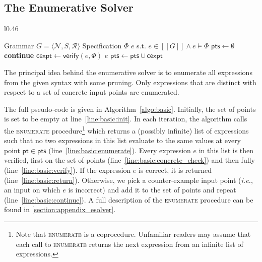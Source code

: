 \documentclass{llncs}
\newcommand{\ie}{\emph{i.e.}}
\newcommand\tuple[1]{\langle #1 \rangle}
\newcommand\Points{\mathsf{pts}}
\newcommand\Point{\mathsf{pt}}
\newcommand\Verify{\mathsf{verify}}
\newcommand\CexInput{\mathsf{cexpt}}
\newcommand\Expr{e}
\newcommand\Spec{\Phi}
\newcommand\Grammar{G}
\newcommand\sem[1]{[\![ #1 ]\!]}
\newcommand\NonTerminals{\mathcal{N}}
\newcommand\StartSymbol{S}
\newcommand\Rules{\mathcal{R}}
\begin{document}
\subsection{The Enumerative Solver}
\label{sec:enumeration}

\begin{wrapfigure}{l}{0.46\textwidth}
  \begin{minipage}{0.46\textwidth}
    \begin{algorithm}[H]
      \begin{algorithmic}[1]
        \fontsize{8}{10}\selectfont
        \Require Grammar $\Grammar = \tuple { \NonTerminals, \StartSymbol, \Rules }$
        \Require Specification $\Spec$
        \Ensure $\Expr$ s.t.  $\Expr \in \sem{\Grammar} \wedge \Expr \models \Spec$
        \State $\Points \gets \emptyset$ \label{line:basic:init}
        \For {$\Expr \in \Call{enumerate}{\Grammar,\Points}$ }\label{line:basic:enumerate}
        \If { $\Expr \not\models \Spec \downharpoonleft  \Points$ } \textbf{continue} \EndIf\label{line:basic:concrete_check}
        \State $\CexInput \gets \Verify(\Expr, \Spec)$ \label{line:basic:verify}
        \If { $\CexInput = \bot$ } \Return $\Expr$ \EndIf \label{line:basic:return}
        \State $\Points \gets \Points \cup \CexInput$ \label{line:basic:continue}
        \EndFor
        \EndWhile
      \end{algorithmic}
      \caption{Enumerative Solver}
      \label{algo:basic}
    \end{algorithm}
  \end{minipage}
\end{wrapfigure}
The principal idea behind the enumerative solver is to enumerate all
expressions from the given syntax with some pruning.
Only expressions that are distinct with respect to a set of concrete
input points are enumerated.

\noindent
The full pseudo-code is given in Algorithm~\ref{algo:basic}.
Initially, the set of points is set to be empty at
line~\ref{line:basic:init}.  In each iteration, the algorithm calls
the \textsc{enumerate} procedure\footnote{Note that \textsc{enumerate} is
a coprocedure.  Unfamiliar readers may assume that each call to \textsc{enumerate}
returns the next expression from an infinite list of
expressions.} which returns a (possibly infinite) list of expressions
such that no two expressions in this list evaluate to the same values
at every point $\Point \in \Points$ (line~\ref{line:basic:enumerate}).
Every expression $\Expr$ in this list is then verified, first on the
set of points (line~\ref{line:basic:concrete_check}) and then fully
(line~\ref{line:basic:verify}).  If the expression $\Expr$ is correct,
it is returned (line~\ref{line:basic:return}).  Otherwise, we pick a
counter-example input point (\ie, an input on which $\Expr$ is
incorrect) and add it to the set of points and repeat
(line~\ref{line:basic:continue}). A full description of the
\textsc{enumerate} procedure can be found in
\ref{section:appendix_esolver}.
\end{document}
